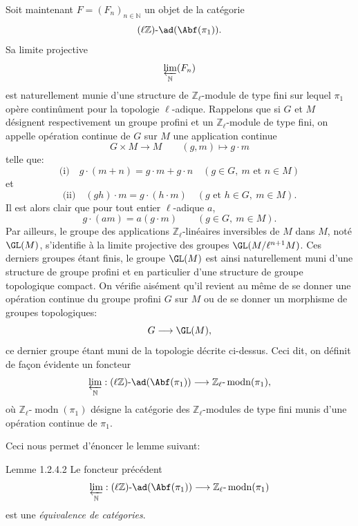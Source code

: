 Soit maintenant \(F=(F_n)_{n\in\mathbb{N}}\) un objet de la catégorie
\[
(\ell\mathbb{Z})\text{-}\ad(\Abf(\pi_1)).
\]
Sa limite projective
\[
\varprojlim_{\mathbb{N}}(F_n)
\]
est naturellement munie d'une structure de \(\mathbb{Z}_\ell\)-module de type fini sur lequel \(\pi_1\) opère continûment pour la topologie \(\ell\)-adique. Rappelons que si \(G\) et \(M\) désignent respectivement un groupe profini et un \(\mathbb{Z}_\ell\)-module de type fini, on appelle opération continue de \(G\) sur \(M\) une application continue
\[
G\times M\longrightarrow M\qquad (g,m)\longmapsto g\cdot m
\]
telle que:
\[
\text{(i)}\quad g\cdot(m+n)=g\cdot m+g\cdot n\quad (g\in G,\ m\text{ et }n\in M)
\]
et
\[
\text{(ii)}\quad (gh)\cdot m=g\cdot(h\cdot m)\quad (g\text{ et }h\in G,\ m\in M).
\]
Il est alors clair que pour tout entier \(\ell\)-adique \(a\),
\[
g\cdot(am)=a(g\cdot m)\qquad (g\in G,\ m\in M).
\]
Par ailleurs, le groupe des applications \(\mathbb{Z}_\ell\)-linéaires inversibles de \(M\) dans \(M\), noté \(\GL(M)\), s'identifie à la limite projective des groupes 
\(\GL(M/\ell^{n+1}M)\). Ces
derniers groupes étant finis, le groupe \(\GL(M)\) est ainsi naturellement muni d'une structure de groupe profini et en particulier d'une structure de groupe topologique compact. On vérifie aisément qu'il revient au même de se donner une opération continue du groupe profini \(G\) sur \(M\) ou de se donner un morphisme de groupes topologiques:
\[
G\longrightarrow \GL(M),
\]
ce dernier groupe étant muni de la topologie décrite ci-dessus. Ceci dit, on définit de façon évidente un foncteur
\[
\varprojlim_{\mathbb{N}}:(\ell\mathbb{Z})\text{-}\ad(\Abf(\pi_1))\longrightarrow
\mathbb{Z}_\ell\text{-}\operatorname{modn}(\pi_1),
\]
où \(\mathbb{Z}_\ell\text{-}\operatorname{modn}(\pi_1)\) désigne la catégorie des \(\mathbb{Z}_\ell\)-modules de type fini munis d'une opération continue de \(\pi_1\).

Ceci nous permet d'énoncer le lemme suivant:

\begin{statement}{Lemme 1.2.4.2}
Le foncteur précédent
\[
\varprojlim_{\mathbb{N}}:(\ell\mathbb{Z})\text{-}\ad(\Abf(\pi_1))
\longrightarrow \mathbb{Z}_\ell\text{-}\operatorname{modn}(\pi_1)
\]
est une \emph{équivalence de catégories}.
\end{statement}


